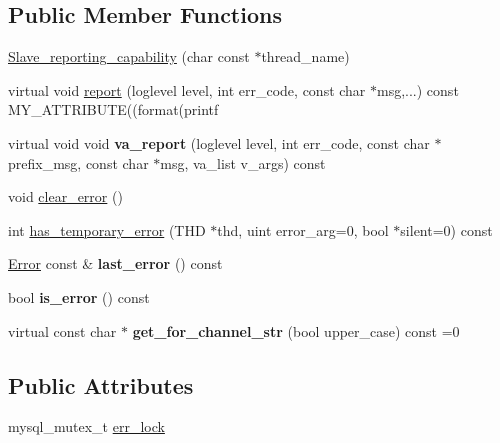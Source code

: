 \subsection*{Public Member Functions}
\begin{DoxyCompactItemize}
\item 
\mbox{\hyperlink{classSlave__reporting__capability_a120871d274a89b1dcb0e8e67490e4987}{Slave\+\_\+reporting\+\_\+capability}} (char const $\ast$thread\+\_\+name)
\item 
virtual void \mbox{\hyperlink{classSlave__reporting__capability_a4a8cc9e71b22ff1f8041585b02b0c541}{report}} (loglevel level, int err\+\_\+code, const char $\ast$msg,...) const M\+Y\+\_\+\+A\+T\+T\+R\+I\+B\+U\+TE((format(printf
\item 
\mbox{\label{classSlave__reporting__capability_a7a32842f1146badfbb20f02bae69a700}} 
virtual void void {\bfseries va\+\_\+report} (loglevel level, int err\+\_\+code, const char $\ast$prefix\+\_\+msg, const char $\ast$msg, va\+\_\+list v\+\_\+args) const
\item 
void \mbox{\hyperlink{classSlave__reporting__capability_ac9a535ead59729c45f3d244490595a8e}{clear\+\_\+error}} ()
\item 
int \mbox{\hyperlink{classSlave__reporting__capability_a9584c38b1663a71b9bbb8c7fcaf6133d}{has\+\_\+temporary\+\_\+error}} (T\+HD $\ast$thd, uint error\+\_\+arg=0, bool $\ast$silent=0) const
\item 
\mbox{\label{classSlave__reporting__capability_a590c443cd0fef2bb44a4245159e4a9e4}} 
\mbox{\hyperlink{classSlave__reporting__capability_1_1Error}{Error}} const  \& {\bfseries last\+\_\+error} () const
\item 
\mbox{\label{classSlave__reporting__capability_ad0cd4b4a5b4576e79f72bd50af5dcb63}} 
bool {\bfseries is\+\_\+error} () const
\item 
\mbox{\label{classSlave__reporting__capability_a4eeea55d5614205aa650f18b78f95bc3}} 
virtual const char $\ast$ {\bfseries get\+\_\+for\+\_\+channel\+\_\+str} (bool upper\+\_\+case) const =0
\end{DoxyCompactItemize}
\subsection*{Public Attributes}
\begin{DoxyCompactItemize}
\item 
mysql\+\_\+mutex\+\_\+t \mbox{\hyperlink{classSlave__reporting__capability_a6889000967fab001bcec9f1aad8e2966}{err\+\_\+lock}}
\end{DoxyCompactItemize}
